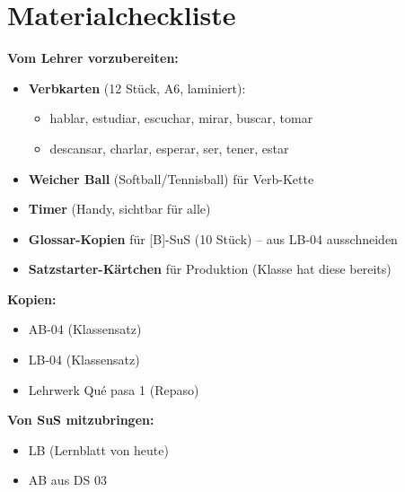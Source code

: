 \documentclass[11pt,a4paper]{article}
\begin{document}
\vspace{0.5cm}

\section*{Materialcheckliste}

\textbf{Vom Lehrer vorzubereiten:}
\begin{itemize}[nosep]
    \item[$\square$] \textbf{Verbkarten} (12 Stück, A6, laminiert):
    \begin{itemize}[nosep]
        \item hablar, estudiar, escuchar, mirar, buscar, tomar
        \item descansar, charlar, esperar, ser, tener, estar
    \end{itemize}
    \item[$\square$] \textbf{Weicher Ball} (Softball/Tennisball) für Verb-Kette
    \item[$\square$] \textbf{Timer} (Handy, sichtbar für alle)
    \item[$\square$] \textbf{Glossar-Kopien} für [B]-SuS (10 Stück) -- aus LB-04 ausschneiden
    \item[$\square$] \textbf{Satzstarter-Kärtchen} für Produktion (Klasse hat diese bereits)
\end{itemize}

\vspace{0.3cm}

\textbf{Kopien:}
\begin{itemize}[nosep]
    \item[$\square$] AB-04 (Klassensatz)
    \item[$\square$] LB-04 (Klassensatz)
    \item[$\square$] Lehrwerk Qué pasa 1 (Repaso)
\end{itemize}

\vspace{0.3cm}

\textbf{Von SuS mitzubringen:}
\begin{itemize}[nosep]
    \item LB (Lernblatt von heute)
    \item AB aus DS 03
\end{itemize}

\vspace{0.5cm}
\end{document}
